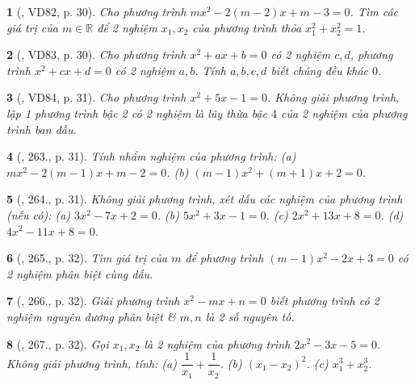 \documentclass{article}
\newtheorem{baitoan}{}
\begin{document}
\begin{baitoan}[\cite{Binh_Toan_9_tap_2}, VD82, p. 30]
	Cho phương trình $mx^2 - 2(m - 2)x + m - 3 = 0$. Tìm các giá trị của $m\in\mathbb{R}$ để 2 nghiệm $x_1,x_2$ của phương trình thỏa $x_1^2 + x_2^2 = 1$.
\end{baitoan}

\begin{baitoan}[\cite{Binh_Toan_9_tap_2}, VD83, p. 30]
	Cho phương trình $x^2 + ax + b = 0$ có 2 nghiệm $c,d$, phương trình $x^2 + cx + d = 0$ có 2 nghiệm $a,b$. Tính $a,b,c,d$ biết chúng đều khác $0$.
\end{baitoan}

\begin{baitoan}[\cite{Binh_Toan_9_tap_2}, VD84, p. 31]
	Cho phương trình $x^2 + 5x - 1 = 0$. Không giải phương trình, lập 1 phương trình bậc 2 có 2 nghiệm là lũy thừa bậc $4$ của 2 nghiệm của phương trình ban đầu.
\end{baitoan}

\begin{baitoan}[\cite{Binh_Toan_9_tap_2}, 263., p. 31]
	Tính nhẩm nghiệm của phương trình: (a) $mx^2 - 2(m - 1)x + m - 2 = 0$. (b) $(m - 1)x^2 + (m + 1)x + 2 = 0$.
\end{baitoan}

\begin{baitoan}[\cite{Binh_Toan_9_tap_2}, 264., p. 31]
	Không giải phương trình, xét dấu các nghiệm của phương trình (nếu có): (a) $3x^2 - 7x + 2 = 0$. (b) $5x^2 + 3x - 1 = 0$. (c) $2x^2 + 13x + 8 = 0$. (d) $4x^2 - 11x + 8 = 0$.
\end{baitoan}

\begin{baitoan}[\cite{Binh_Toan_9_tap_2}, 265., p. 32]
	Tìm giá trị của $m$ để phương trình $(m - 1)x^2 - 2x + 3 = 0$ có 2 nghiệm phân biệt cùng dấu.
\end{baitoan}

\begin{baitoan}[\cite{Binh_Toan_9_tap_2}, 266., p. 32]
	Giải phương trình $x^2 - mx + n = 0$ biết phương trình có 2 nghiệm nguyên dương phân biệt \& $m,n$ là 2 số nguyên tố.
\end{baitoan}

\begin{baitoan}[\cite{Binh_Toan_9_tap_2}, 267., p. 32]
	Gọi $x_1,x_2$ là 2 nghiệm của phương trình $2x^2 - 3x - 5 = 0$. Không giải phương trình, tính: (a) $\dfrac{1}{x_1} + \dfrac{1}{x_2}$. (b) $(x_1 - x_2)^2$. (c) $x_1^3 + x_2^3$.
\end{baitoan}
\end{document}
